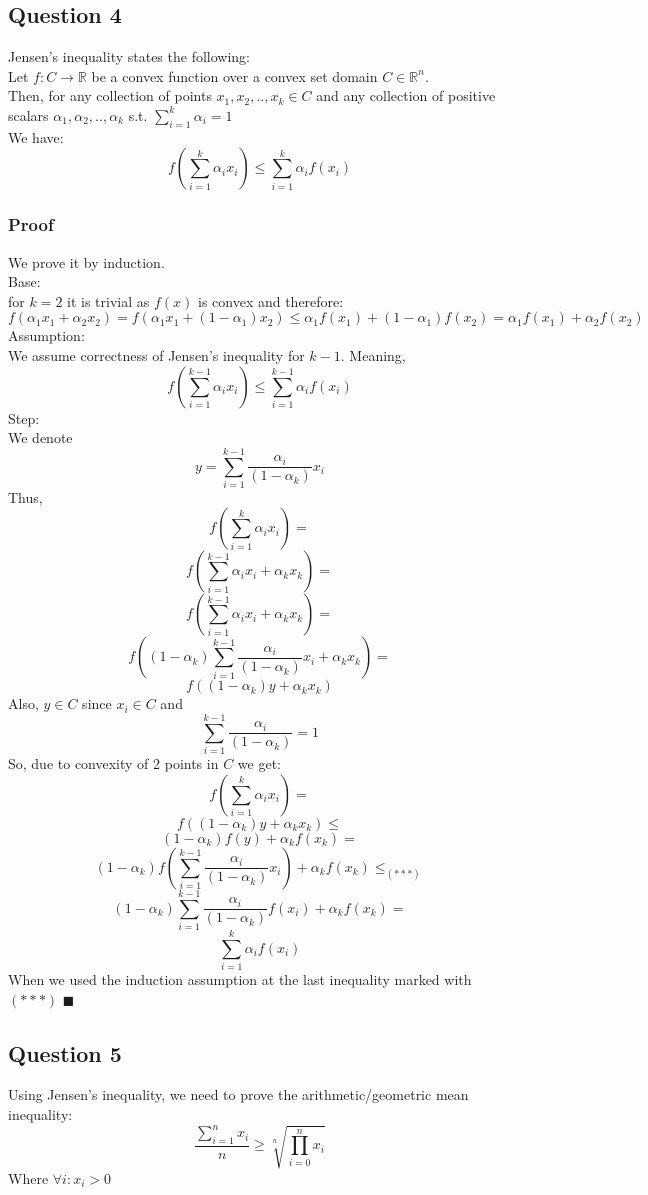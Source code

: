 \documentclass{article}
\newcommand{\qed}{\hfill$\blacksquare$}
\begin{document}
\subsection{Question 4}
Jensen's inequality states the following:\\
Let $f:C \rightarrow \mathbb{R}$ be a convex function over a convex set domain $C \in \mathbb{R}^n$.\\
Then, for any collection of points $x_1,x_2,..,x_k \in C$ and any collection of positive scalars $\alpha_1,\alpha_2,..,\alpha_k$ s.t. $\sum_{i=1}^k \alpha_i = 1$\\
We have:
$$f(\sum_{i=1}^k \alpha_i x_i) \leq \sum_{i=1}^k \alpha_i f(x_i)$$
\subsubsection*{Proof}
We prove it by induction.\\
Base:\\
for $k=2$ it is trivial as $f(x)$ is convex and therefore:
$$f(\alpha_1 x_1 + \alpha_2 x_2) = f(\alpha_1 x_1 + (1-\alpha_1) x_2) \leq \alpha_1 f(x_1) + (1-\alpha_1) f(x_2) = \alpha_1 f(x_1) + \alpha_2 f(x_2)$$
Assumption:\\
We assume correctness of Jensen's inequality for $k-1$. Meaning,
$$f(\sum_{i=1}^{k-1} \alpha_i x_i) \leq \sum_{i=1}^{k-1} \alpha_i f(x_i)$$
Step:\\
We denote $$y=\sum_{i=1}^{k-1} \frac{\alpha_i}{(1-\alpha_k)} x_i$$ Thus,
$$f(\sum_{i=1}^{k} \alpha_i x_i) = $$
$$f(\sum_{i=1}^{k-1} \alpha_i x_i + \alpha_k x_k) = $$
$$f(\sum_{i=1}^{k-1} \alpha_i x_i + \alpha_k x_k) =$$
$$ f((1-\alpha_k)\sum_{i=1}^{k-1} \frac{\alpha_i}{(1-\alpha_k)} x_i + \alpha_k x_k) =$$
$$f((1-\alpha_k)y + \alpha_k x_k)$$
Also, $y\in C$ since $x_i \in C$ and
$$\sum_{i=1}^{k-1} \frac{\alpha_i}{(1-\alpha_k)}=1$$
So, due to convexity of 2 points in $C$ we get:
$$f(\sum_{i=1}^{k} \alpha_i x_i) = $$
$$f((1-\alpha_k)y + \alpha_k x_k) \leq$$
$$(1-\alpha_k)f(y) + \alpha_k f(x_k) = $$
$$(1-\alpha_k) f(\sum_{i=1}^{k-1} \frac{\alpha_i}{(1-\alpha_k)} x_i) + \alpha_k f(x_k) \leq_{(***)}$$
$$(1-\alpha_k) \sum_{i=1}^{k-1} \frac{\alpha_i}{(1-\alpha_k)} f(x_i) + \alpha_k f(x_k) =$$
$$\sum_{i=1}^{k} \alpha_i f(x_i)$$
When we used the induction assumption at the last inequality marked with $(***)$
\qed
\newpage

\subsection{Question 5}
Using Jensen’s inequality, we need to prove the arithmetic/geometric mean inequality:
$$\frac{\sum_{i=1}^n x_i}{n} \geq \sqrt[n]{\prod_{i=0}^n x_i}$$
Where $\forall i : x_i >0$
\end{document}
